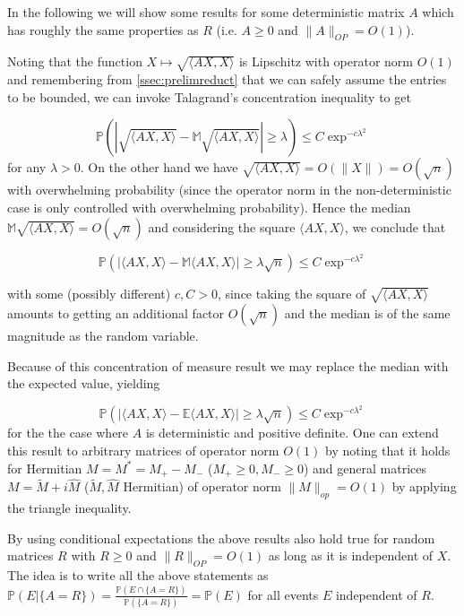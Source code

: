 In the following we will show some results for some deterministic matrix $A$ which has roughly the same properties as $R$ (i.e. $A\geq 0$ and $\|A\|_{OP}=O(1)$).

Noting that the function $X\mapsto \sqrt{\langle AX,X\rangle}$ is Lipschitz with operator norm $O(1)$ and remembering from \ref{ssec:prelimreduct} that we can safely assume the entries to be bounded, we can invoke Talagrand's concentration inequality to get 

$$\mathbb P(|\sqrt{\langle AX,X\rangle}-\mathbb M\sqrt{\langle AX,X\rangle}|\geq\lambda)\leq C\exp^{-c\lambda^2}$$
for any $\lambda>0$. On the other hand we have $\sqrt{\langle AX,X\rangle}=O(\|X\|)=O(\sqrt n)$ with overwhelming probability (since the operator norm in the non-deterministic case is only controlled with overwhelming probability). Hence the median $\mathbb M\sqrt{\langle AX,X\rangle}=O(\sqrt n)$ and considering the square $\langle AX,X\rangle$, we conclude that

$$\mathbb P(|\langle AX,X\rangle-\mathbb M\langle AX,X\rangle|\geq\lambda\sqrt n)\leq C\exp^{-c\lambda^2}$$

with some (possibly different) $c,C>0$, since taking the square of \newline$\sqrt{\langle AX,X\rangle}$ amounts to getting an additional factor $O(\sqrt n)$ and the median is of the same magnitude as the random variable.

Because of this concentration of measure result we may replace the median with the expected value, yielding

\begin{equation}\label{eq:concentrationOfXRXAroundTrR}
	\mathbb P(|\langle AX,X\rangle-\mathbb E\langle AX,X\rangle|\geq\lambda\sqrt n)\leq C\exp^{-c\lambda^2}
\end{equation}
for the the case where $A$ is deterministic and positive definite. One can extend this result to arbitrary matrices of operator norm $O(1)$ by noting that it holds for Hermitian $M=M^*=M_+-M_-$ ($M_+\geq 0,M_-\geq 0$) and general matrices $M = \tilde M+i\hat M$ ($\tilde M,\hat M$ Hermitian) of operator norm $\|M\|_{op}=O(1)$ by applying the triangle inequality.

\begin{remark}\label{rem:conditionalExpectationForDeterministicResult}
	By using conditional expectations the above results also hold true for random matrices $R$ with $R\geq 0$ and $\|R\|_{OP}=O(1)$ as long as it is independent of $X$. The idea is to write all the above statements as $\mathbb P(E|\{A=R\})=\frac{\mathbb P(E\cap\{A=R\})}{\mathbb P(\{A=R\})}=\mathbb P(E)$ for all events $E$ independent of $R$.
\end{remark}

